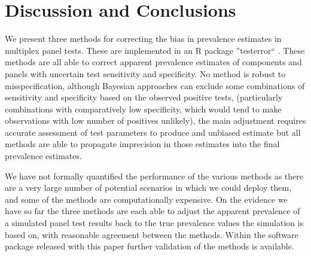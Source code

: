 \documentclass[a4paper, 12pt, twoside]{article}
\let\Oldsection\section
\renewcommand{\section}{\FloatBarrier\Oldsection}
\begin{document}
\section{Discussion and Conclusions}

We present three methods for correcting the bias in prevalence estimates in multiplex panel tests. These are implemented in an R package ''testerror`` \cite{challen2023d}. These methods are all able to correct apparent prevalence estimates of components and panels with uncertain test sensitivity and specificity. No method is robust to misspecification, although Bayesian approaches can exclude some combinations of sensitivity and specificity based on the observed positive tests, (particularly combinations with comparatively low specificity, which would tend to make observations with low number of positives unlikely), the main adjustment requires accurate assessment of test parameters to produce and unbiased estimate but all methods are able to propagate imprecision in those estimates into the final prevalence estimates.

We have not formally quantified the performance of the various methods as there are a very large number of potential scenarios in which we could deploy them, and some of the methods are computationally expensive. On the evidence we have so far the three methods are each able to adjust the apparent prevalence of a simulated panel test results back to the true prevalence values the simulation is based on, with reasonable agreement between the methods. Within the software package released with this paper further validation of the methods is available.


\end{document}
